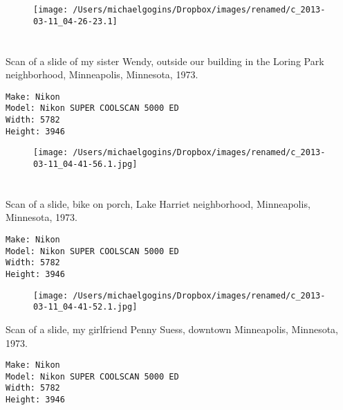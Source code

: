 \documentclass[11pt,letter,DIV=14,paper=landscape]{scrbook}
\begin{document}
\begin{figure}
\texttt{[image: /Users/michaelgogins/Dropbox/images/renamed/c\_2013-03-11\_04-26-23.1]}
\end{figure}

\clearpage
\section{\protect{}}
\noindent Scan of a slide of my sister Wendy, outside our building in the Loring Park neighborhood, Minneapolis, Minnesota, 1973.
\noindent
\begin{lstlisting}
Make: Nikon
Model: Nikon SUPER COOLSCAN 5000 ED
Width: 5782
Height: 3946
\end{lstlisting}
\clearpage

\begin{figure}
\texttt{[image: /Users/michaelgogins/Dropbox/images/renamed/c\_2013-03-11\_04-41-56.1.jpg]}
\end{figure}
\clearpage
\section{\protect{}}
\noindent Scan of a slide, bike on porch, Lake Harriet neighborhood, Minneapolis, Minnesota, 1973.
\noindent
\begin{lstlisting}
Make: Nikon
Model: Nikon SUPER COOLSCAN 5000 ED
Width: 5782
Height: 3946
\end{lstlisting}
\clearpage

\begin{figure}
\texttt{[image: /Users/michaelgogins/Dropbox/images/renamed/c\_2013-03-11\_04-41-52.1.jpg]}
\end{figure}


\clearpage
\noindent Scan of a slide, my girlfriend Penny Suess, downtown Minneapolis, Minnesota, 1973.
\noindent
\begin{lstlisting}
Make: Nikon
Model: Nikon SUPER COOLSCAN 5000 ED
Width: 5782
Height: 3946
\end{lstlisting}
\clearpage
\end{document}
